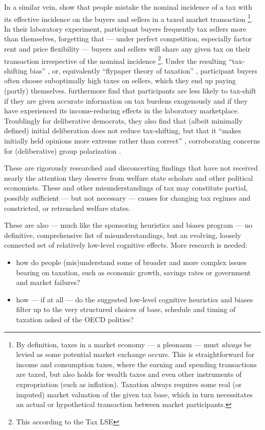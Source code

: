 In a similar vein, \cite{SausgruberTyran2011} show that people mistake the nominal incidence of a tax with its effective incidence on the buyers and sellers in a taxed market transaction
\footnote{
	By definition, taxes in a market economy --- a pleonasm --- must \emph{always} be levied as some potential market exchange occurs.
	This is straightforward for income and consumption taxes, where the earning and spending transactions are taxed, but also holds for wealth taxes and even other instruments of expropriation (such as inflation).
	Taxation always requires some real (or imputed) market valuation of the given tax base, which in turn necessitates an actual or hypothetical transaction between market participants.}. %
In their laboratory experiment, participant buyers frequently tax sellers more than themselves, forgetting that --- under perfect competition, especially factor rent and price flexibility --- buyers and sellers will share any given tax on their transaction irrespective of the nominal incidence \footnote{%
	This according to the \gls{Tax LSE}}.
Under the resulting ``tax-shifting bias'' \citep{SausgruberTyran2011}, or, equivalently ``flypaper theory of taxation'' \citep{McCafferyBaron2003}, participant buyers often choose suboptimally high taxes on sellers, which they end up paying (partly) themselves.
\citeauthor{SausgruberTyran2011} furthermore find that participants are less likely to tax-shift if they are given accurate information on tax burdens exogenously and if they have experienced its income-reducing effects in the laboratory marketplace. 
Troublingly for deliberative democrats, they also find that (albeit minimally defined) initial deliberation does not reduce tax-shifting, but that it ``makes initially held opinions more extreme rather than correct'' \citeyear[164]{SausgruberTyran2011}, corroborating concerns for (deliberative) group polarization \citep{Sunstein1991}.

These are rigorously researched and disconcerting findings that have not received nearly the attention they deserve from welfare state scholars and other political economists. 
These and other misunderstandings of tax may constitute partial, possibly sufficient --- but not necessary --- causes for changing tax regimes and constricted, or retrenched welfare states.

These are also --- much like the sponsoring heuristics and biases program --- no definitive, comprehensive list of misunderstandings, but an evolving, loosely connected set of relatively low-level cognitive effects.
More research is needed: 
\begin{itemize}
	\item how do people (mis)understand some of broader and more complex issues bearing on taxation, such as economic growth, savings rates or government and market failures? 
	\item how --- if at all --- do the suggested low-level cognitive heuristics and biases filter up to the very structured choices of base, schedule and timing of taxation asked of the \gls{OECD} polities?
\end{itemize}

